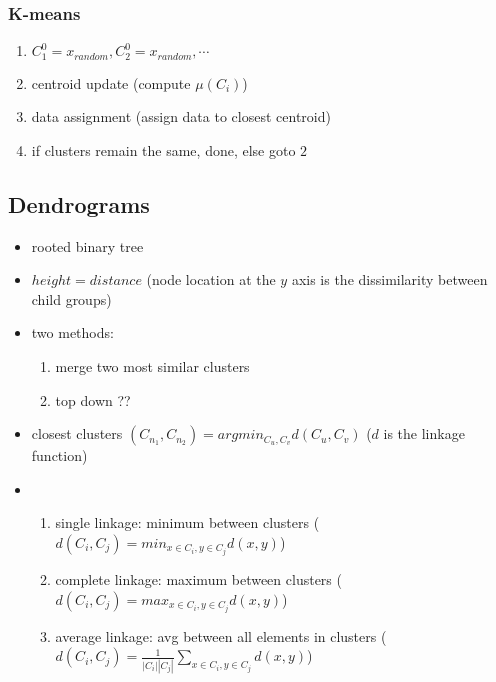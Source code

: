 \documentclass[a4paper]{article}
\begin{document}
\subsubsection*{K-means}
\begin{enumerate}
\item $C^0_1 = x_{random}, C^0_2 = x_{random}, \cdots $ 
\item centroid update (compute $\mu(C_i)$)
\item data assignment (assign data to closest centroid)
\item if clusters remain the same, done, else goto $2$
\end{enumerate}

\subsection*{Dendrograms}
\begin{itemize}
\item rooted binary tree
\item $height = distance$ (node location at the $y$ axis is the dissimilarity between child groups)
\item two methods: \begin{enumerate}
	\item merge two most similar clusters
	\item top down ??
\end{enumerate}
\item closest clusters $(C_{n_1}, C_{n_2}) = argmin_{C_u, C_v} d(C_u, C_v)$ ($d$ is the linkage function)
\item \begin{enumerate}
	\item single linkage: minimum between clusters ($d(C_i, C_j) = min_{x\in C_i, y\in C_j} d(x,y)$)
	\item complete linkage: maximum between clusters ($d(C_i, C_j) = max_{x\in C_i, y\in C_j} d(x,y)$)
	\item average linkage: avg between all elements in clusters ($d(C_i, C_j) = \frac{1}{|C_i||C_j|} \sum_{x\in C_i, y\in C_j} d(x,y)$)
\end{enumerate}
\end{itemize}
\end{document}
